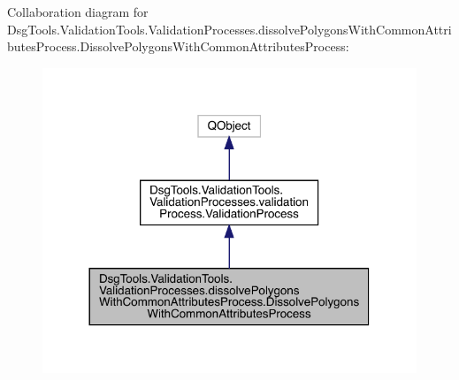 Collaboration diagram for Dsg\+Tools.\+Validation\+Tools.\+Validation\+Processes.\+dissolve\+Polygons\+With\+Common\+Attributes\+Process.\+Dissolve\+Polygons\+With\+Common\+Attributes\+Process\+:
\nopagebreak
\begin{figure}[H]
\begin{center}
\leavevmode
\includegraphics[width=317pt]{class_dsg_tools_1_1_validation_tools_1_1_validation_processes_1_1dissolve_polygons_with_common_a8ebf975c98d6a5b890702145ac96734d}
\end{center}
\end{figure}
